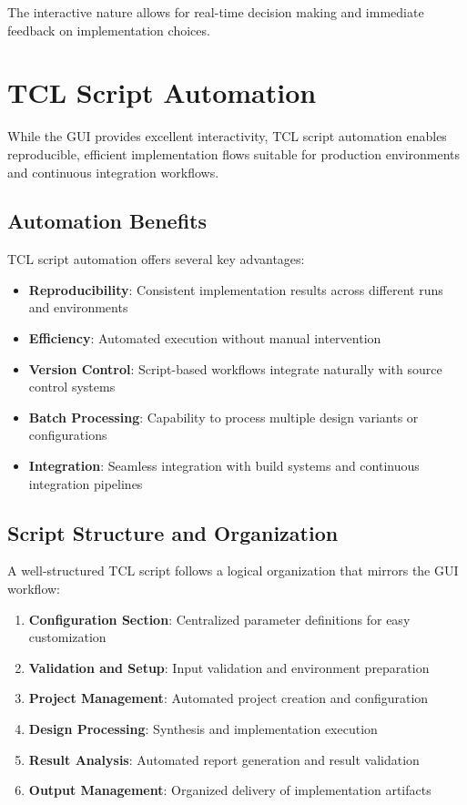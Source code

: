 The interactive nature allows for real-time decision making and immediate feedback on implementation choices.

\section{TCL Script Automation}
\label{sec:tcl_automation}

While the GUI provides excellent interactivity, TCL script automation enables reproducible, efficient implementation flows suitable for production environments and continuous integration workflows.

\subsection{Automation Benefits}

TCL script automation offers several key advantages:

\begin{itemize}
    \item \textbf{Reproducibility}: Consistent implementation results across different runs and environments
    \item \textbf{Efficiency}: Automated execution without manual intervention
    \item \textbf{Version Control}: Script-based workflows integrate naturally with source control systems
    \item \textbf{Batch Processing}: Capability to process multiple design variants or configurations
    \item \textbf{Integration}: Seamless integration with build systems and continuous integration pipelines
\end{itemize}

\subsection{Script Structure and Organization}

A well-structured TCL script follows a logical organization that mirrors the GUI workflow:

\begin{enumerate}
    \item \textbf{Configuration Section}: Centralized parameter definitions for easy customization
    \item \textbf{Validation and Setup}: Input validation and environment preparation
    \item \textbf{Project Management}: Automated project creation and configuration
    \item \textbf{Design Processing}: Synthesis and implementation execution
    \item \textbf{Result Analysis}: Automated report generation and result validation
    \item \textbf{Output Management}: Organized delivery of implementation artifacts
\end{enumerate}

